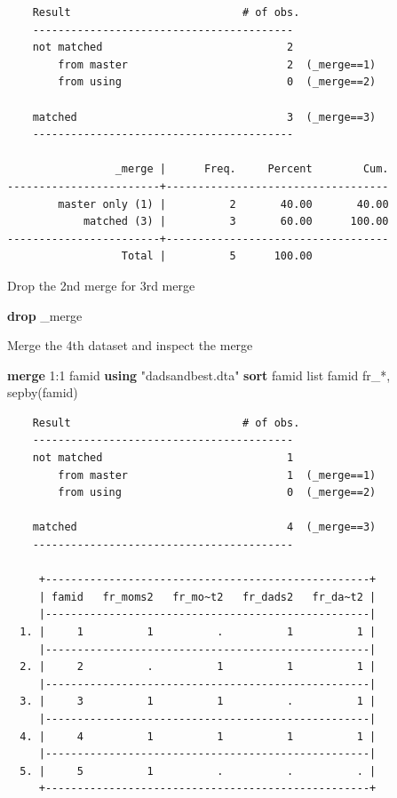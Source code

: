 \documentclass[
]{book}
\newenvironment{Shaded}{\begin{snugshade}}{\end{snugshade}}
\newcommand{\DataTypeTok}[1]{\textcolor[rgb]{0.13,0.29,0.53}{#1}}
\newcommand{\KeywordTok}[1]{\textcolor[rgb]{0.13,0.29,0.53}{\textbf{#1}}}
\newcommand{\NormalTok}[1]{#1}
\newcommand{\OtherTok}[1]{\textcolor[rgb]{0.56,0.35,0.01}{#1}}
\newcommand{\StringTok}[1]{\textcolor[rgb]{0.31,0.60,0.02}{#1}}
\begin{document}
\begin{verbatim}
    Result                           # of obs.
    -----------------------------------------
    not matched                             2
        from master                         2  (_merge==1)
        from using                          0  (_merge==2)

    matched                                 3  (_merge==3)
    -----------------------------------------

                 _merge |      Freq.     Percent        Cum.
------------------------+-----------------------------------
        master only (1) |          2       40.00       40.00
            matched (3) |          3       60.00      100.00
------------------------+-----------------------------------
                  Total |          5      100.00
\end{verbatim}

Drop the 2nd merge for 3rd merge

\begin{Shaded}
\begin{Highlighting}[]
\KeywordTok{drop} \DataTypeTok{\_merge}
\end{Highlighting}
\end{Shaded}

Merge the 4th dataset and inspect the merge

\begin{Shaded}
\begin{Highlighting}[]
\KeywordTok{merge}\NormalTok{ 1:1 famid }\KeywordTok{using} \StringTok{"dadsandbest.dta"}
\KeywordTok{sort}\NormalTok{ famid}
\OtherTok{list}\NormalTok{ famid fr\_*, sepby(famid)}
\end{Highlighting}
\end{Shaded}

\begin{verbatim}
    Result                           # of obs.
    -----------------------------------------
    not matched                             1
        from master                         1  (_merge==1)
        from using                          0  (_merge==2)

    matched                                 4  (_merge==3)
    -----------------------------------------

     +---------------------------------------------------+
     | famid   fr_moms2   fr_mo~t2   fr_dads2   fr_da~t2 |
     |---------------------------------------------------|
  1. |     1          1          .          1          1 |
     |---------------------------------------------------|
  2. |     2          .          1          1          1 |
     |---------------------------------------------------|
  3. |     3          1          1          .          1 |
     |---------------------------------------------------|
  4. |     4          1          1          1          1 |
     |---------------------------------------------------|
  5. |     5          1          .          .          . |
     +---------------------------------------------------+
\end{verbatim}
\end{document}
